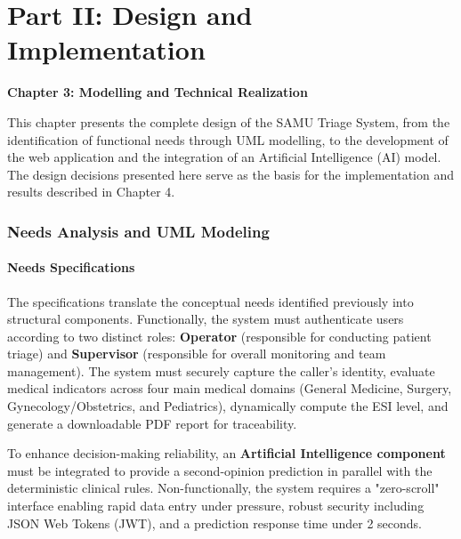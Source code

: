 \documentclass[a4paper,12pt,oneside]{report}
\begin{document}
\part*{Part II: Design and Implementation}

\newpage
\thispagestyle{fancy}
{\LARGE \bfseries \noindent Chapter 3: Modelling and Technical Realization}
\vspace{2em}
\renewcommand{\thesection}{\Roman{section}}
\justifying

This chapter presents the complete design of the SAMU Triage System, from the identification of functional needs through UML modelling, to the development of the web application and the integration of an Artificial Intelligence (AI) model. The design decisions presented here serve as the basis for the implementation and results described in Chapter 4.

\section{Needs Analysis and UML Modeling}

\subsection{Needs Specifications}
The specifications translate the conceptual needs identified previously into structural components. Functionally, the system must authenticate users according to two distinct roles: \textbf{Operator} (responsible for conducting patient triage) and \textbf{Supervisor} (responsible for overall monitoring and team management). The system must securely capture the caller's identity, evaluate medical indicators across four main medical domains (General Medicine, Surgery, Gynecology/Obstetrics, and Pediatrics), dynamically compute the ESI level, and generate a downloadable PDF report for traceability. 

To enhance decision-making reliability, an \textbf{Artificial Intelligence component} must be integrated to provide a second-opinion prediction in parallel with the deterministic clinical rules. Non-functionally, the system requires a "zero-scroll" interface enabling rapid data entry under pressure, robust security including JSON Web Tokens (JWT), and a prediction response time under 2 seconds.
\end{document}
